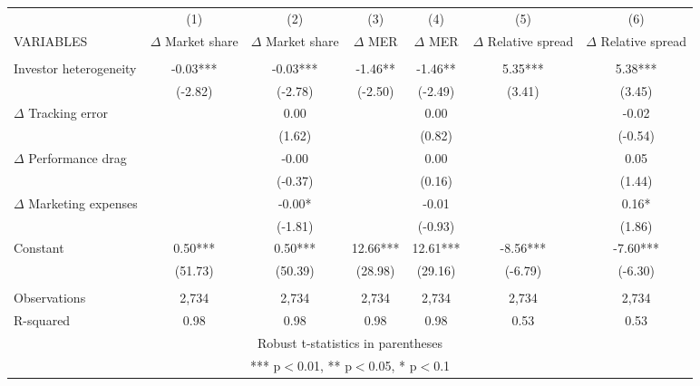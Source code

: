 \documentclass[]{article}
\begin{document}
\begin{tabular}{lcccccc} \hline
 & (1) & (2) & (3) & (4) & (5) & (6) \\
VARIABLES & $\Delta$ Market share & $\Delta$ Market share & $\Delta$ MER & $\Delta$ MER & $\Delta$ Relative spread & $\Delta$ Relative spread \\ \hline
 &  &  &  &  &  &  \\
Investor heterogeneity & -0.03*** & -0.03*** & -1.46** & -1.46** & 5.35*** & 5.38*** \\
 & (-2.82) & (-2.78) & (-2.50) & (-2.49) & (3.41) & (3.45) \\
$\Delta$ Tracking error &  & 0.00 &  & 0.00 &  & -0.02 \\
 &  & (1.62) &  & (0.82) &  & (-0.54) \\
$\Delta$ Performance drag &  & -0.00 &  & 0.00 &  & 0.05 \\
 &  & (-0.37) &  & (0.16) &  & (1.44) \\
$\Delta$ Marketing expenses &  & -0.00* &  & -0.01 &  & 0.16* \\
 &  & (-1.81) &  & (-0.93) &  & (1.86) \\
Constant & 0.50*** & 0.50*** & 12.66*** & 12.61*** & -8.56*** & -7.60*** \\
 & (51.73) & (50.39) & (28.98) & (29.16) & (-6.79) & (-6.30) \\
 &  &  &  &  &  &  \\
Observations & 2,734 & 2,734 & 2,734 & 2,734 & 2,734 & 2,734 \\
 R-squared & 0.98 & 0.98 & 0.98 & 0.98 & 0.53 & 0.53 \\ \hline
\multicolumn{7}{c}{ Robust t-statistics in parentheses} \\
\multicolumn{7}{c}{ *** p$<$0.01, ** p$<$0.05, * p$<$0.1} \\
\end{tabular}
\end{document}
